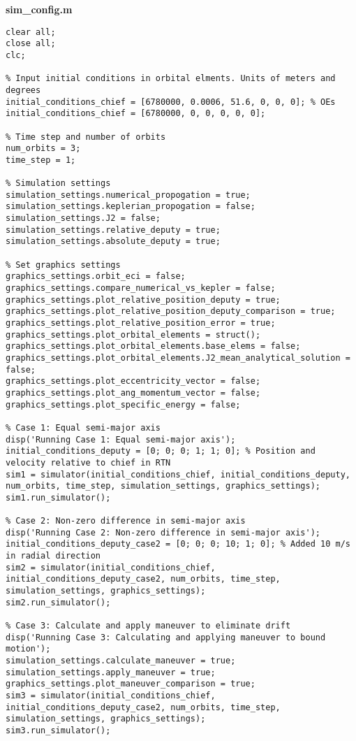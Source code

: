 \textbf{sim\_config.m}
\begin{lstlisting}
clear all;
close all;
clc;

% Input initial conditions in orbital elments. Units of meters and degrees
initial_conditions_chief = [6780000, 0.0006, 51.6, 0, 0, 0]; % OEs
initial_conditions_chief = [6780000, 0, 0, 0, 0, 0]; 

% Time step and number of orbits
num_orbits = 3;
time_step = 1;

% Simulation settings
simulation_settings.numerical_propogation = true;
simulation_settings.keplerian_propogation = false;
simulation_settings.J2 = false;
simulation_settings.relative_deputy = true;
simulation_settings.absolute_deputy = true;

% Set graphics settings
graphics_settings.orbit_eci = false;
graphics_settings.compare_numerical_vs_kepler = false;
graphics_settings.plot_relative_position_deputy = true;
graphics_settings.plot_relative_position_deputy_comparison = true;
graphics_settings.plot_relative_position_error = true;
graphics_settings.plot_orbital_elements = struct();
graphics_settings.plot_orbital_elements.base_elems = false;
graphics_settings.plot_orbital_elements.J2_mean_analytical_solution = false;
graphics_settings.plot_eccentricity_vector = false;
graphics_settings.plot_ang_momentum_vector = false;
graphics_settings.plot_specific_energy = false;

% Case 1: Equal semi-major axis
disp('Running Case 1: Equal semi-major axis');
initial_conditions_deputy = [0; 0; 0; 1; 1; 0]; % Position and velocity relative to chief in RTN
sim1 = simulator(initial_conditions_chief, initial_conditions_deputy, num_orbits, time_step, simulation_settings, graphics_settings);
sim1.run_simulator();

% Case 2: Non-zero difference in semi-major axis
disp('Running Case 2: Non-zero difference in semi-major axis');
initial_conditions_deputy_case2 = [0; 0; 0; 10; 1; 0]; % Added 10 m/s in radial direction
sim2 = simulator(initial_conditions_chief, initial_conditions_deputy_case2, num_orbits, time_step, simulation_settings, graphics_settings);
sim2.run_simulator();

% Case 3: Calculate and apply maneuver to eliminate drift
disp('Running Case 3: Calculating and applying maneuver to bound motion');
simulation_settings.calculate_maneuver = true;
simulation_settings.apply_maneuver = true;
graphics_settings.plot_maneuver_comparison = true;
sim3 = simulator(initial_conditions_chief, initial_conditions_deputy_case2, num_orbits, time_step, simulation_settings, graphics_settings);
sim3.run_simulator();
\end{lstlisting}

